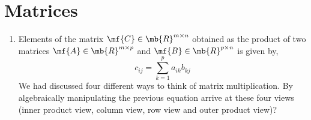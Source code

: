 
\chapter{Matrices}

\begin{enumerate}[resume]
    \item Elements of the matrix $\mf{C} \in \mb{R}^{m \times n}$ obtained as the product of two matrices $\mf{A} \in \mb{R}^{m \times p}$ and $\mf{B} \in \mb{R}^{p \times n}$ is given by,
    \[ c_{ij} = \sum_{k=1}^{p}a_{ik}b_{kj} \]
    We had discussed four different ways to think of matrix multiplication. By algebraically manipulating the previous equation arrive at these four views (inner product view, column view, row view and outer product view)? 




\end{enumerate}
